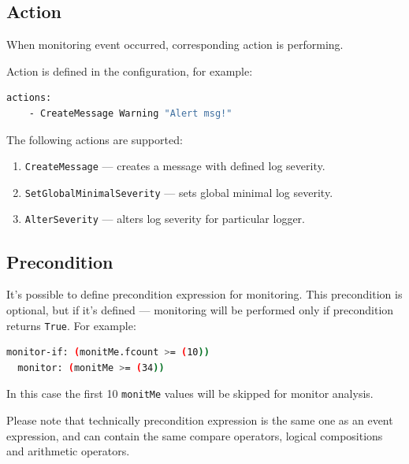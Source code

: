 \begin{mdframed}
\section*{Action}

When monitoring event occurred, corresponding action is performing.

Action is defined in the configuration, for example:

\begin{lstlisting}[language=bash]
  actions:
    - CreateMessage Warning "Alert msg!"
\end{lstlisting}

The following actions are supported:

\begin{enumerate}
  \item \texttt{CreateMessage} --- creates a message with defined log severity.
  \item \texttt{SetGlobalMinimalSeverity} --- sets global minimal log severity.
  \item \texttt{AlterSeverity} --- alters log severity for particular logger.
\end{enumerate}
\end{mdframed}

\begin{mdframed}
\section*{Precondition}

It's possible to define precondition expression for monitoring. This precondition is optional, but if it's defined --- monitoring will be performed only if precondition returns \texttt{True}. For example:

\begin{lstlisting}[language=bash]
  monitor-if: (monitMe.fcount >= (10))
  monitor: (monitMe >= (34))
\end{lstlisting}

In this case the first 10 \texttt{monitMe} values will be skipped for monitor analysis.

Please note that technically precondition expression is the same one as an event expression, and can contain the same compare operators, logical compositions and arithmetic operators.

\end{mdframed}


